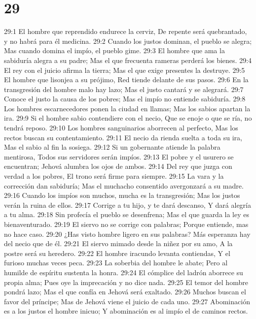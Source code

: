 \chapter{29}


29:1 El hombre que reprendido endurece la cerviz,  
De repente será quebrantado, y no habrá para él medicina.  
29:2 Cuando los justos dominan, el pueblo se alegra;  
Mas cuando domina el impío, el pueblo gime.  
29:3 El hombre que ama la sabiduría alegra a su padre;  
Mas el que frecuenta rameras perderá los bienes.  
29:4 El rey con el juicio afirma la tierra;  
Mas el que exige presentes la destruye.  
29:5 El hombre que lisonjea a su prójimo,  
Red tiende delante de sus pasos.  
29:6 En la transgresión del hombre malo hay lazo;  
Mas el justo cantará y se alegrará.  
29:7 Conoce el justo la causa de los pobres;  
Mas el impío no entiende sabiduría.  
29:8 Los hombres escarnecedores ponen la ciudad en llamas;  
Mas los sabios apartan la ira.  
29:9 Si el hombre sabio contendiere con el necio,  
Que se enoje o que se ría, no tendrá reposo.  
29:10 Los hombres sanguinarios aborrecen al perfecto,  
Mas los rectos buscan su contentamiento.  
29:11 El necio da rienda suelta a toda su ira,  
Mas el sabio al fin la sosiega.  
29:12 Si un gobernante atiende la palabra mentirosa,  
Todos sus servidores serán impíos.  
29:13 El pobre y el usurero se encuentran;  
Jehová alumbra los ojos de ambos.  
29:14 Del rey que juzga con verdad a los pobres,  
El trono será firme para siempre.  
29:15 La vara y la corrección dan sabiduría;  
Mas el muchacho consentido avergonzará a su madre.  
29:16 Cuando los impíos son muchos, mucha es la transgresión;  
Mas los justos verán la ruina de ellos.  
29:17 Corrige a tu hijo, y te dará descanso,  
Y dará alegría a tu alma.  
29:18 Sin profecía el pueblo se desenfrena;  
Mas el que guarda la ley es bienaventurado.  
29:19 El siervo no se corrige con palabras;  
Porque entiende, mas no hace caso.  
29:20 ¿Has visto hombre ligero en sus palabras?  
Más esperanza hay del necio que de él.  
29:21 El siervo mimado desde la niñez por su amo,  
A la postre será su heredero.  
29:22 El hombre iracundo levanta contiendas,  
Y el furioso muchas veces peca.  
29:23 La soberbia del hombre le abate;  
Pero al humilde de espíritu sustenta la honra.  
29:24 El cómplice del ladrón aborrece su propia alma;  
Pues oye la imprecación y no dice nada.  
29:25 El temor del hombre pondrá lazo;  
Mas el que confía en Jehová será exaltado.  
29:26 Muchos buscan el favor del príncipe;  
Mas de Jehová viene el juicio de cada uno.  
29:27 Abominación es a los justos el hombre inicuo;  
Y abominación es al impío el de caminos rectos. 


